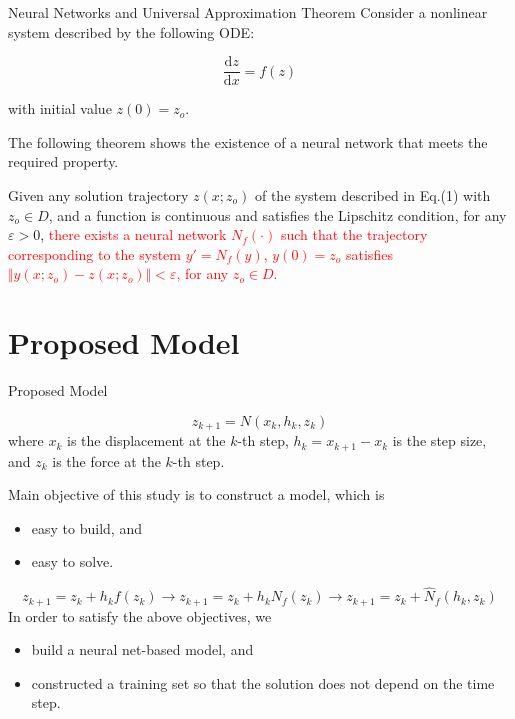\documentclass[9pt]{beamer}
\newcounter{frame}[frame]
\begin{document}
\begin{frame}{Neural Networks and Universal Approximation Theorem}
Consider a nonlinear system described by the following ODE:

\begin{equation}
 \frac{\mathrm dz}{\mathrm dx} = f(z)
\end{equation}

\noindent with initial value $z(0) = z_o$. 

The following theorem shows the existence of a neural network that meets the required property. 

\begin{theorem}
Given any solution trajectory $z(x;z_o)$ of the system described in Eq.(1) with $z_o\in D$, and a function is continuous and satisfies the Lipschitz condition, for any $\varepsilon > 0$, \textcolor{red}{there exists a neural network $N_f(\cdot)$ such that the trajectory corresponding to the system $y'=N_f(y)$, $y(0)=z_o$ satisfies $\Vert y(x;z_o) - z(x;z_o)\Vert < \varepsilon$, for any $z_o\in D$.} 
\end{theorem}

\end{frame}

\section{Proposed Model}

\begin{frame}{Proposed Model}

\hrulefill
\[z_{k+1} = N(x_k,h_k,z_k)\]
\noindent where $x_k$ is the displacement at the $k$-th step, $h_k=x_{k+1} - x_k$ is the step size, and $z_k$ is the force at the $k$-th step.

\hrulefill

Main objective of this study is to construct a model, which is
\begin{itemize}
	\item easy to build, and
	\item easy to solve.   
\end{itemize}

\[z_{k+1} = z_k + h_k f(z_k) \rightarrow z_{k+1} = z_k + h_k N_f(z_k) \rightarrow z_{k+1} = z_k + \hat N_f(h_k,z_k)\]
In order to satisfy the above objectives, we 
\begin{itemize}
	\item build a neural net-based model, and
	\item constructed a training set so that the solution does not depend on the time step.
\end{itemize}
\end{frame}
\end{document}
